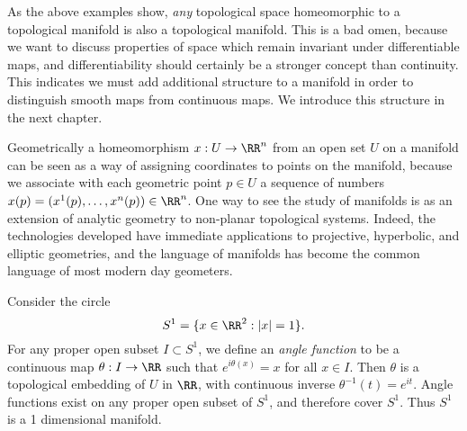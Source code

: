 


\begin{remark}
    As the above examples show, \emph{any} topological space homeomorphic to a topological manifold is also a topological manifold. This is a bad omen, because we want to discuss properties of space which remain invariant under differentiable maps, and differentiability should certainly be a stronger concept than continuity. This indicates we must add additional structure to a manifold in order to distinguish smooth maps from continuous maps. We introduce this structure in the next chapter.
\end{remark}

Geometrically a homeomorphism $x: U \to \RR^n$ from an open set $U$ on a manifold can be seen as a way of assigning coordinates to points on the manifold, because we associate with each geometric point $p \in U$ a sequence of numbers $x(p) = (x^1(p), \dots, x^n(p)) \in \RR^n$. One way to see the study of manifolds is as an extension of analytic geometry to non-planar topological systems. Indeed, the technologies developed have immediate applications to projective, hyperbolic, and elliptic geometries, and the language of manifolds has become the common language of most modern day geometers.

\begin{example}
    Consider the circle
    \[ S^1 = \{ x \in \RR^2 : |x| = 1 \}. \]
    For any proper open subset $I \subset S^1$, we define an \emph{angle function} to be a continuous map $\theta: I \to \RR$ such that $e^{i\theta(x)} = x$ for all $x \in I$. Then $\theta$ is a topological embedding of $U$ in $\RR$, with continuous inverse $\theta^{-1}(t) = e^{it}$. Angle functions exist on any proper open subset of $S^1$, and therefore cover $S^1$. Thus $S^1$ is a 1 dimensional manifold.
\end{example}

